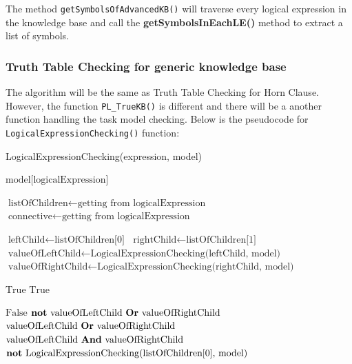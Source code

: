 \documentclass{assignment}
\begin{document}
The method \texttt{getSymbolsOfAdvancedKB()} will traverse every logical expression in the knowledge base and call the \textbf{getSymbolsInEachLE()} method to extract a list of symbols.

\subsubsection{Truth Table Checking for generic knowledge base}

The algorithm will be the same as Truth Table Checking for Horn Clause. However, the function \texttt{PL\_TrueKB()} is different and there will be a another function handling the task model checking. Below is the pseudocode for \texttt{LogicalExpressionChecking()} function:

\begin{algorithm}
\caption{LogicalExpressionChecking(expression, model)}
\small
\begin{algorithmic}[1]
        \State \Return $\text{model[logicalExpression]}$
    \EndIf
    
    \State $\text{listOfChildren} \gets \text{getting from logicalExpression}$
    \State $\text{connective} \gets \text{getting from logicalExpression}$
    
        \State $\text{leftChild} \gets \text{listOfChildren[0]}$
        \State $\text{rightChild} \gets \text{listOfChildren[1]}$
        \State $\text{valueOfLeftChild} \gets \text{LogicalExpressionChecking(leftChild, model)}$
        \State $\text{valueOfRightChild} \gets \text{LogicalExpressionChecking(rightChild, model)}$
        
                \State \Return $\text{True}$
                \State \Return $\text{True}$
            \EndIf
            
            \State \Return $\text{False}$
            \State \Return $\text{\textbf{not} valueOfLeftChild \textbf{Or} valueOfRightChild}$
            \State \Return $\text{valueOfLeftChild \textbf{Or} valueOfRightChild}$
            \State \Return $\text{valueOfLeftChild \textbf{And} valueOfRightChild}$
        \EndIf
    \Else
        \State \Return $\text{\textbf{not} LogicalExpressionChecking(listOfChildren[0], model)}$
    \EndIf
\EndFunction
\end{algorithmic}
\end{algorithm}
\end{document}
